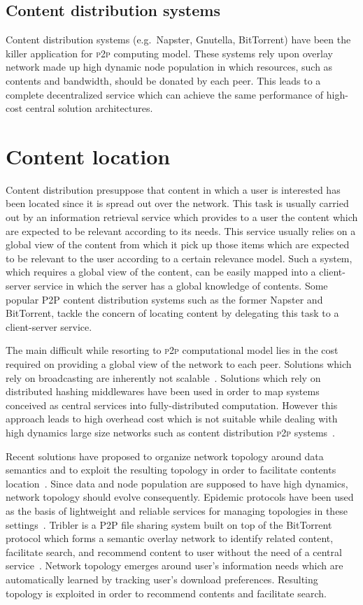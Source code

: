 \subsection{Content distribution systems}
Content distribution systems (e.g.\ Napster, Gnutella, BitTorrent) have been the killer application for \textsc{p2p} computing model. These systems rely upon overlay network made up high dynamic node population in which resources, such as contents and bandwidth, should be donated by each peer. This leads to a complete decentralized service which can achieve the same performance of high-cost central solution architectures.

\section{\label{sec:intro_content_location}Content location}
Content distribution presuppose that content in which a user is interested has been located since it is spread out over the network. This task is usually carried out by an information retrieval service which provides to a user the content which are expected to be relevant according to its needs. This service usually relies on a global view of the content from which it pick up those items which are expected to be relevant to the user according to a certain relevance model. Such a system, which requires a global view of the content, can be easily mapped into a client-server service in which the server has a global knowledge of contents. Some popular P2P content distribution systems such as the former Napster and BitTorrent, tackle the concern of locating content by delegating this task to a client-server service.

The main difficult while resorting to \textsc{p2p} computational model lies in the cost required on providing a global view of the network to each peer. Solutions which rely on broadcasting are inherently not scalable~\cite{CRB+03}. Solutions which rely on distributed hashing middlewares have been used in order to map systems conceived as central services into fully-distributed computation. However this approach leads to high overhead cost which is not suitable while dealing with high dynamics large size networks such as content distribution \textsc{p2p} systems~\cite{RV03, LLH+03}.

Recent solutions have proposed to organize network topology around data semantics and to exploit the resulting topology in order to facilitate contents location~\cite{RM06}. Since data and node population are supposed to have high dynamics, network topology should evolve consequently. Epidemic protocols have been used as the basis of lightweight and reliable services for managing topologies in these settings~\cite{VS05}. Tribler is a \textsc{P2P} file sharing system built on top of the BitTorrent protocol which forms a semantic overlay network to identify related content, facilitate search, and recommend content to user without the need of a central service~\cite{PGW+08}. Network topology emerges around user's information needs which are automatically learned by tracking user's download preferences. Resulting topology is exploited in order to recommend contents and facilitate search.

